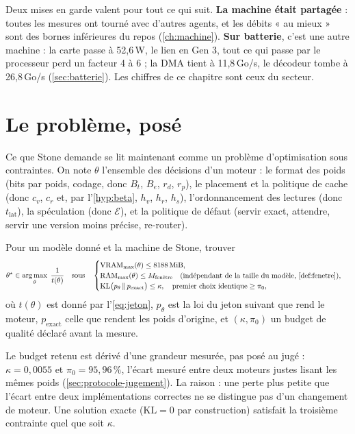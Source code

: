 Deux mises en garde valent pour tout ce qui suit. \textbf{La machine était partagée} : toutes les mesures ont tourné avec d'autres agents, et les débits « au mieux » sont des bornes inférieures du repos (\cref{ch:machine}). \textbf{Sur batterie}, c'est une autre machine : la carte passe à 52,6\,W, le lien en Gen 3, tout ce qui passe par le processeur perd un facteur 4 à 6 ; la DMA tient à 11,8\,Go/s, le décodeur tombe à 26,8\,Go/s (\cref{sec:batterie}). Les chiffres de ce chapitre sont ceux du secteur.

\section{Le problème, posé}\label{sec:probleme}

Ce que Stone demande se lit maintenant comme un problème d'optimisation sous contraintes. On note $\theta$ l'ensemble des décisions d'un moteur : le format des poids (bits par poids, codage, donc $B_t$, $B_e$, $r_d$, $r_p$), le placement et la politique de cache (donc $c_v$, $c_r$ et, par l'\cref{hyp:beta}, $h_v$, $h_r$, $h_s$), l'ordonnancement des lectures (donc $t_{\mathrm{lat}}$), la spéculation (donc $\mathcal E$), et la politique de défaut (servir exact, attendre, servir une version moins précise, re-router).

\begin{definition}\label{def:probleme}
Pour un modèle donné et la machine de Stone, trouver
\begin{equation}\label{eq:probleme}
\theta^\star \in \argmax_{\theta}\; \frac{1}{t(\theta)}
\quad\text{sous}\quad
\begin{cases}
\mathrm{VRAM}_{\max}(\theta) \le \SI{8188}{\mebi\byte}, \\
\mathrm{RAM}_{\max}(\theta) \le M_{\text{fenêtre}} \quad \text{(indépendant de la taille du modèle, \cref{def:fenetre})}, \\
\mathrm{KL}\bigl(p_\theta \,\|\, p_{\text{exact}}\bigr) \le \kappa, \quad \text{premier choix identique} \ge \pi_0 ,
\end{cases}
\end{equation}
où $t(\theta)$ est donné par l'\cref{eq:jeton}, $p_\theta$ est la loi du jeton suivant que rend le moteur, $p_{\text{exact}}$ celle que rendent les poids d'origine, et $(\kappa, \pi_0)$ un budget de qualité déclaré avant la mesure.
\end{definition}

Le budget retenu est dérivé d'une grandeur mesurée, pas posé au jugé : $\kappa = 0{,}0055$ et $\pi_0 = 95{,}96\,\%$, l'écart mesuré entre deux moteurs justes lisant les mêmes poids (\cref{sec:protocole-jugement}). La raison : une perte plus petite que l'écart entre deux implémentations correctes ne se distingue pas d'un changement de moteur. Une solution exacte ($\mathrm{KL} = 0$ par construction) satisfait la troisième contrainte quel que soit $\kappa$.

